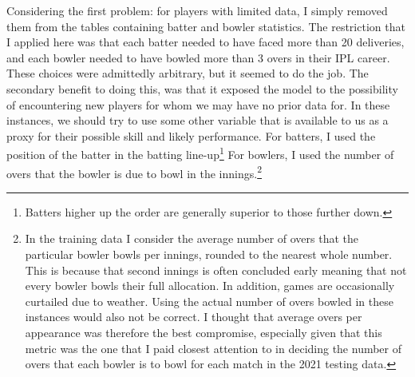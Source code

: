 Considering the first problem: for players with limited data, I simply removed them from the tables containing batter and bowler statistics. The restriction that I applied here was that each batter needed to have faced more than 20 deliveries, and each bowler needed to have bowled more than 3 overs in their IPL career. These choices were admittedly arbitrary, but it seemed to do the job. The secondary benefit to doing this, was that it exposed the model to the possibility of encountering new players for whom we may have no prior data for. In these instances, we should try to use some other variable that is available to us as a proxy for their possible skill and likely performance. For batters, I used the position of the batter in the batting line-up\footnote{Batters higher up the order are generally superior to those further down.} For bowlers, I used the number of overs that the bowler is due to bowl in the innings.\footnote{In the training data I consider the average number of overs that the particular bowler bowls per innings, rounded to the nearest whole number. This is because that second innings is often concluded early meaning that not every bowler bowls their full allocation. In addition, games are occasionally curtailed due to weather. Using the actual number of overs bowled in these instances would also not be correct. I thought that average overs per appearance was therefore the best compromise, especially given that this metric was the one that I paid closest attention to in deciding the number of overs that each bowler is to bowl for each match in the 2021 testing data.}

